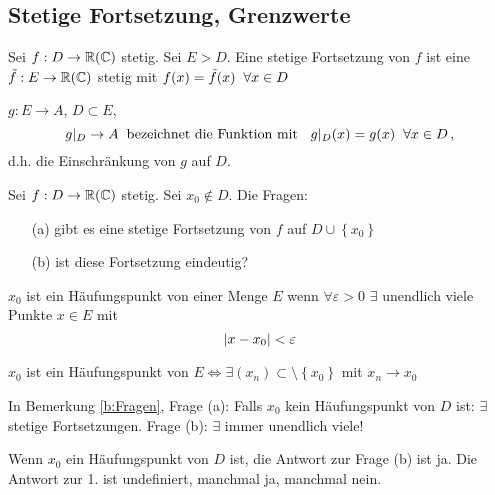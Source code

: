\subsection{Stetige Fortsetzung, Grenzwerte}
\begin{Def}
  Sei $f:D\to\mathbb{R}(\mathbb{C})$ stetig. Sei $E>D$. 
Eine stetige Fortsetzung von $f$ ist eine $\tilde f:E\to\mathbb{R}(\mathbb{C})$ stetig mit $f(x)=\tilde f(x)\hspace{2mm}\forall x\in D$
\end{Def}
\begin{Def}
  $g:E\to A$, $D\subset E$, 
  \[g|_D\to A\hspace{2mm}\text{bezeichnet die Funktion mit }\hspace{2mm} g|_D(x)=g(x)\hspace{2mm}\forall x\in D\, ,\]
d.h. die Einschr\"ankung von $g$ auf $D$.
\end{Def}
\begin{Bem}\label{b:Fragen}
  Sei $f:D\to\mathbb{R}(\mathbb{C})$ stetig. Sei $x_0\not\in D$. Die Fragen:
  \begin{itemize}
    \item[(a)] gibt es eine stetige Fortsetzung von $f$ auf $D\cup \left\{ x_0 \right\}$
    \item[(b)] ist diese Fortsetzung eindeutig?
  \end{itemize}
\end{Bem}
\begin{Def}
  $x_0$ ist ein Häufungspunkt von einer Menge $E$ wenn $\forall \varepsilon>0$ $\exists$ unendlich viele Punkte $x\in E$ mit
  \[\mathopen| x-x_0 \mathclose|<\varepsilon\]
\end{Def}
\begin{Bem}
  $x_0$ ist ein Häufungspunkt von $E\iff \exists(x_n)\subset\setminus\left\{ x_0 \right\}$ mit $x_n\to x_0$
\end{Bem}
\begin{Bem}
  In Bemerkung \ref{b:Fragen}, Frage (a): 
Falls $x_0$ kein Häufungspunkt von $D$ ist: $\exists$ stetige Fortsetzungen.
Frage (b): $\exists$ immer unendlich viele!
\end{Bem}
\begin{Bem}
  Wenn $x_0$ ein Häufungspunkt von $D$ ist, die Antwort zur Frage (b) ist ja. 
Die Antwort zur 1. ist undefiniert, manchmal ja, manchmal nein.
\end{Bem}


